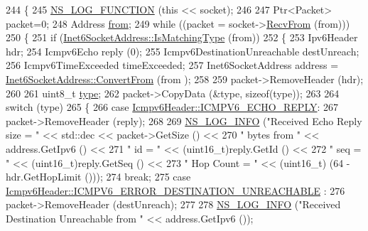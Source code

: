 \begin{DoxyCode}
244 \{
245   \hyperlink{log-macros-disabled_8h_a90b90d5bad1f39cb1b64923ea94c0761}{NS\_LOG\_FUNCTION} (\textcolor{keyword}{this} << socket);
246 
247   Ptr<Packet> packet=0;
248   Address \hyperlink{lte__amc_8m_a1b4c81ff74eb1a626b5ade44c81004b3}{from};
249   \textcolor{keywordflow}{while} ((packet = socket->\hyperlink{classns3_1_1Socket_af22378d7af9a2745a9eada20210da215}{RecvFrom} (from)))
250     \{
251       \textcolor{keywordflow}{if} (\hyperlink{classns3_1_1Inet6SocketAddress_a4d928c54affbfb530a12076d6d7e0540}{Inet6SocketAddress::IsMatchingType} (from))
252         \{
253           Ipv6Header hdr;
254           Icmpv6Echo reply (0);
255           Icmpv6DestinationUnreachable destUnreach;
256           Icmpv6TimeExceeded timeExceeded;
257           Inet6SocketAddress address = \hyperlink{classns3_1_1Inet6SocketAddress_a2177c66e1bcf17c85dcffb9d2a971f5a}{Inet6SocketAddress::ConvertFrom} (from
      );
258 
259           packet->RemoveHeader (hdr);
260 
261           uint8\_t \hyperlink{visualizer-ideas_8txt_add98db9e15e2a58cf2b57623e7aa893a}{type};
262           packet->CopyData (&type, \textcolor{keyword}{sizeof}(type));
263 
264           \textcolor{keywordflow}{switch} (type)
265             \{
266             \textcolor{keywordflow}{case} \hyperlink{classns3_1_1Icmpv6Header_ad13fcbee075bf00f66ffbc57dfbecb70aa20a65a542b5851b5e711d036f1d0533}{Icmpv6Header::ICMPV6\_ECHO\_REPLY}:
267               packet->RemoveHeader (reply);
268 
269               \hyperlink{group__logging_gafbd73ee2cf9f26b319f49086d8e860fb}{NS\_LOG\_INFO} (\textcolor{stringliteral}{"Received Echo Reply size  = "} << std::dec << packet->GetSize () <<
270                            \textcolor{stringliteral}{" bytes from "} << address.GetIpv6 () <<
271                            \textcolor{stringliteral}{" id =  "} << (uint16\_t)reply.GetId () <<
272                            \textcolor{stringliteral}{" seq = "} << (uint16\_t)reply.GetSeq () <<
273                            \textcolor{stringliteral}{" Hop Count = "} << (uint16\_t) (64 - hdr.GetHopLimit ()));
274               \textcolor{keywordflow}{break};
275             \textcolor{keywordflow}{case} \hyperlink{classns3_1_1Icmpv6Header_ad13fcbee075bf00f66ffbc57dfbecb70a888f534b20f4895d2c440cd1631eeaed}{Icmpv6Header::ICMPV6\_ERROR\_DESTINATION\_UNREACHABLE}
      :
276               packet->RemoveHeader (destUnreach);
277 
278               \hyperlink{group__logging_gafbd73ee2cf9f26b319f49086d8e860fb}{NS\_LOG\_INFO} (\textcolor{stringliteral}{"Received Destination Unreachable from "} << address.GetIpv6 ());

\end{DoxyCode}
